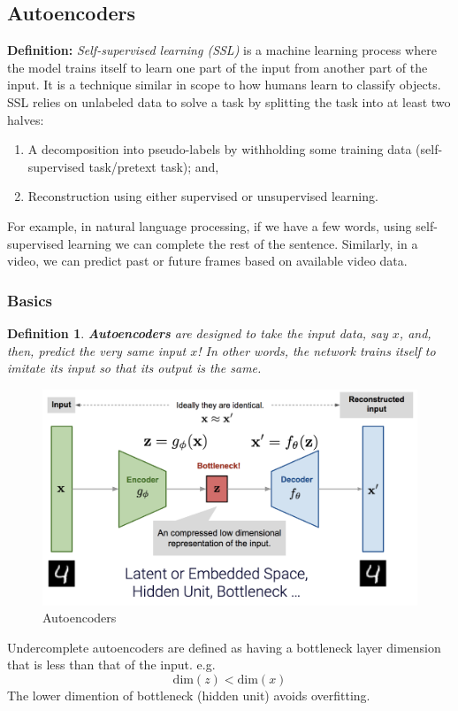 \documentclass[11pt,a4paper]{article}
\newtheorem{definition}{Definition}
\begin{document}
\subsection{Autoencoders}
\textbf{Definition:} \textit{Self-supervised learning (SSL)} is a machine learning process where the model trains itself to learn one part of the input from another part of the input. It is a technique similar in scope to how humans learn to classify objects. SSL relies on unlabeled data to solve a task by splitting the task into at least two halves:
\begin{enumerate}
    \item A decomposition into pseudo-labels by withholding some training data (self-supervised task/pretext task); and,
    \item Reconstruction using either supervised or unsupervised learning.
\end{enumerate}
For example, in natural language processing, if we have a few words, using self-supervised learning we can complete the rest of the sentence. Similarly, in a video, we can predict past or future frames based on available video data.

\subsubsection{Basics}
\begin{definition}
    \textbf{Autoencoders} are designed to take the input data, say $x$, and, then, predict the very same input $x$! In other words, the network trains itself to imitate its input so that its output is the same.
\end{definition}
\begin{center}\begin{figure}[htbp]
    \centering
    \includegraphics[scale=0.2]{Autoencoders.png}
    \caption{Autoencoders}
    \label{}
\end{figure}\end{center}
Undercomplete autoencoders are defined as having a bottleneck layer dimension that is less than that of the input. e.g. $$\text{dim}(z)<\text{dim}(x)$$
The lower dimention of bottleneck (hidden unit) avoids overfitting.
\end{document}
